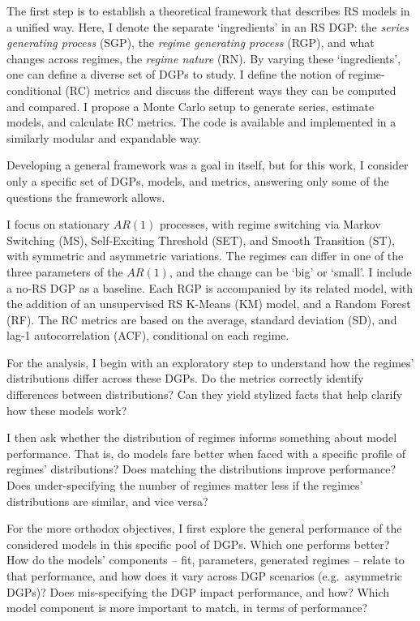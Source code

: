 \documentclass[
  letterpaper,
  DIV=11,
  numbers=noendperiod]{scrartcl}
\numberwithin{equation}{section}
\numberwithin{table}{section}
\numberwithin{figure}{section}
\begin{document}
The first step is to establish a theoretical framework that describes RS
models in a unified way. Here, I denote the separate `ingredients' in an
RS DGP: the \emph{series generating process} (SGP), the \emph{regime
generating process} (RGP), and what changes across regimes, the
\emph{regime nature} (RN). By varying these `ingredients', one can
define a diverse set of DGPs to study. I define the notion of
regime-conditional (RC) metrics and discuss the different ways they can
be computed and compared. I propose a Monte Carlo setup to generate
series, estimate models, and calculate RC metrics. The code is available
and implemented in a similarly modular and expandable way.

Developing a general framework was a goal in itself, but for this work,
I consider only a specific set of DGPs, models, and metrics, answering
only some of the questions the framework allows.

I focus on stationary \(AR(1)\) processes, with regime switching via
Markov Switching (MS), Self-Exciting Threshold (SET), and Smooth
Transition (ST), with symmetric and asymmetric variations. The regimes
can differ in one of the three parameters of the \(AR(1)\), and the
change can be `big' or `small'. I include a no-RS DGP as a baseline.
Each RGP is accompanied by its related model, with the addition of an
unsupervised RS K-Means (KM) model, and a Random Forest (RF). The RC
metrics are based on the average, standard deviation (SD), and lag-1
autocorrelation (ACF), conditional on each regime.

For the analysis, I begin with an exploratory step to understand how the
regimes' distributions differ across these DGPs. Do the metrics
correctly identify differences between distributions? Can they yield
stylized facts that help clarify how these models work?

I then ask whether the distribution of regimes informs something about
model performance. That is, do models fare better when faced with a
specific profile of regimes' distributions? Does matching the
distributions improve performance? Does under-specifying the number of
regimes matter less if the regimes' distributions are similar, and vice
versa?

For the more orthodox objectives, I first explore the general
performance of the considered models in this specific pool of DGPs.
Which one performs better? How do the models' components -- fit,
parameters, generated regimes -- relate to that performance, and how
does it vary across DGP scenarios (e.g.~asymmetric DGPs)? Does
mis-specifying the DGP impact performance, and how? Which model
component is more important to match, in terms of performance?
\end{document}
